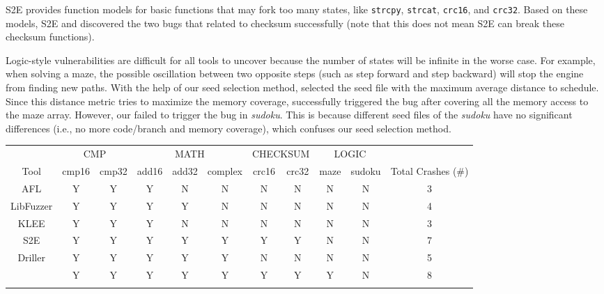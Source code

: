 S2E provides function models for basic functions that may fork too 
many states, like \texttt{strcpy}, \texttt{strcat}, \texttt{crc16},
 and \texttt{crc32}. Based on these models, S2E and \prototype 
 discovered the two bugs that related to checksum successfully 
 (note that this does not mean S2E can break these checksum functions). 

Logic-style vulnerabilities are difficult for all tools to uncover 
because the number of states will be infinite in the worse case.
For example, when solving a maze, the possible oscillation between 
two opposite steps (such as step forward and step backward) 
will stop the engine from finding new paths.
With the help of our seed selection method, \prototype selected 
the seed file with the maximum average distance to schedule. 
Since this distance metric tries to maximize the memory coverage, 
\prototype successfully triggered the bug after covering all 
the memory access to the maze array. 
However, our \prototype failed to trigger the bug in \textit{sudoku}. 
This is because different seed files of the \textit{sudoku} have no 
significant differences (i.e., no more code/branch and memory coverage), 
which confuses our seed selection method.

\begin{table}[!t]
{\begin{tabular*}{20pc}{ccccccccccc}\toprule
	& \multicolumn{2}{c}{CMP}  & \multicolumn{3}{c}{MATH} & \multicolumn{2}{c}{CHECKSUM} 
	& 	\multicolumn{2}{c}{LOGIC} & \\ 
	    Tool & cmp16 & cmp32 & add16 & add32 & complex & crc16 & 
	    crc32 & maze & sudoku & Total Crashes (\#) \\
\midrule
		AFL 		& Y & Y & Y & N & N & N & N & N & N & 3 \\
		LibFuzzer	& Y & Y & Y & Y & N & N & N & N & N & 4\\
		KLEE		& Y & Y & Y & N & N & N & N & N & N & 3\\
		S2E			& Y & Y & Y & Y & Y & Y & Y & N & N & 7\\
		Driller		& Y & Y & Y & Y & Y & N & N & N & N & 5\\
		\prototype	& Y & Y & Y & Y & Y & Y & Y & Y & N & 8\\
\botrule
\end{tabular*}}{}
\end{table}

